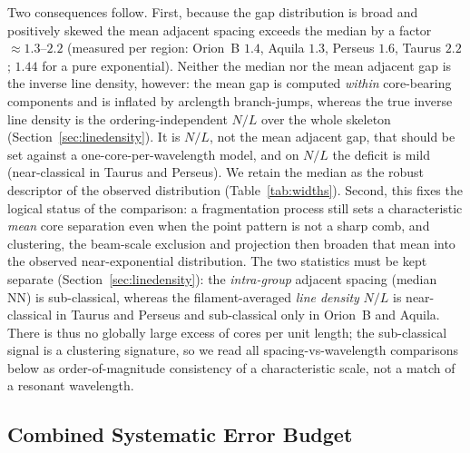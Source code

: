 \documentclass[usenatbib,twoside,twocolumn]{mnras}
\begin{document}
Two consequences follow. First, because the gap distribution is broad and positively skewed the mean adjacent spacing exceeds the median by a factor $\approx1.3$--$2.2$ (measured per region: Orion~B $1.4$, Aquila $1.3$, Perseus $1.6$, Taurus $2.2$; $1.44$ for a pure exponential). Neither the median nor the mean adjacent gap is the inverse line density, however: the mean gap is computed \emph{within} core-bearing components and is inflated by arclength branch-jumps, whereas the true inverse line density is the ordering-independent $N/L$ over the whole skeleton (Section~\ref{sec:linedensity}). It is $N/L$, not the mean adjacent gap, that should be set against a one-core-per-wavelength model, and on $N/L$ the deficit is mild (near-classical in Taurus and Perseus). We retain the median as the robust descriptor of the observed distribution (Table~\ref{tab:widths}). Second, this fixes the logical status of the comparison: a fragmentation process still sets a characteristic \emph{mean} core separation even when the point pattern is not a sharp comb, and clustering, the beam-scale exclusion and projection then broaden that mean into the observed near-exponential distribution. The two statistics must be kept separate (Section~\ref{sec:linedensity}): the \emph{intra-group} adjacent spacing (median NN) is sub-classical, whereas the filament-averaged \emph{line density} $N/L$ is near-classical in Taurus and Perseus and sub-classical only in Orion~B and Aquila. There is thus no globally large excess of cores per unit length; the sub-classical signal is a clustering signature, so we read all spacing-vs-wavelength comparisons below as order-of-magnitude consistency of a characteristic scale, not a match of a resonant wavelength.

\subsection{Combined Systematic Error Budget}
\label{sec:error_budget}
\end{document}
